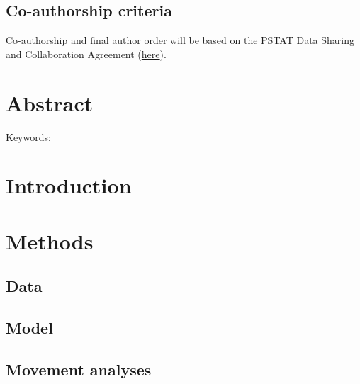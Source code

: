 \documentclass{article}
\begin{document}
\subsection{Co-authorship criteria}
Co-authorship and final author order will be based on the PSTAT Data Sharing and Collaboration Agreement (\href{https://docs.google.com/document/d/1AXIhq6lO_qOPf7q67s_SiDOD6qEfih0COtxQZo7v-Hc/edit?usp=sharing}{here}).


\section{Abstract}

\noindent Keywords: 

\section{Introduction}


\section{Methods}

\subsection{Data}

\subsection{Model}

\subsection{Movement analyses}
\end{document}
